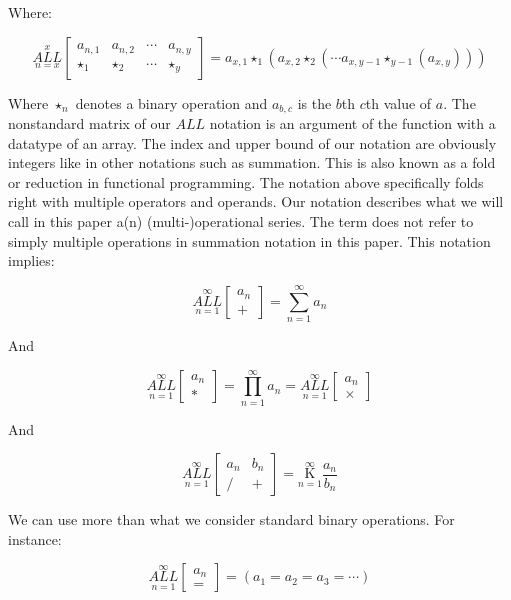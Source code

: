 \documentclass{article}
\begin{document}
Where:

$$\underset{n=x}{\overset{x}{ALL}} \begin{bmatrix}
a_{n,1} & a_{n,2} & \cdots & a_{n,y} \\
\star_1 & \star_2 & \cdots & \star_y
\end{bmatrix}=a_{x,1} \star_1 (a_{x,2} \star_2 (\cdots a_{x,y-1} \star_{y-1} (a_{x,y})))$$

Where $\star_n$ denotes a binary operation and $a_{b,c}$ is the $b$th $c$th value of $a$. The nonstandard matrix of our $ALL$ notation is an argument of the function with a datatype of an array. The index and upper bound of our notation are obviously integers like in other notations such as summation. This is also known as a fold or reduction in functional programming. The notation above specifically folds right with multiple operators and operands. Our notation describes what we will call in this paper a(n) (multi-)operational series. The term does not refer to simply multiple operations in summation notation in this paper. This notation implies:

$$\underset{n=1}{\overset{\infty}{ALL}} \begin{bmatrix}
a_n \\
+
\end{bmatrix}= \underset{n=1}{\overset{\infty}{\sum}} a_n$$

And

$$\underset{n=1}{\overset{\infty}{ALL}} \begin{bmatrix}
a_n \\
*
\end{bmatrix}= \underset{n=1}{\overset{\infty}{\prod}} a_n = \underset{n=1}{\overset{\infty}{ALL}} \begin{bmatrix}
a_n \\
\times
\end{bmatrix}$$

And

$$\underset{n=1}{\overset{\infty}{ALL}} \begin{bmatrix}
a_n & b_n \\
/ & +
\end{bmatrix}= \underset{n=1}{\overset{\infty}{\mathrm K}} \frac{a_n}{b_n}$$

We can use more than what we consider standard binary operations. For instance:

$$\underset{n=1}{\overset{\infty}{ALL}} \begin{bmatrix}
a_n \\
=
\end{bmatrix} = (a_1=a_2=a_3=\cdots)$$
\end{document}
